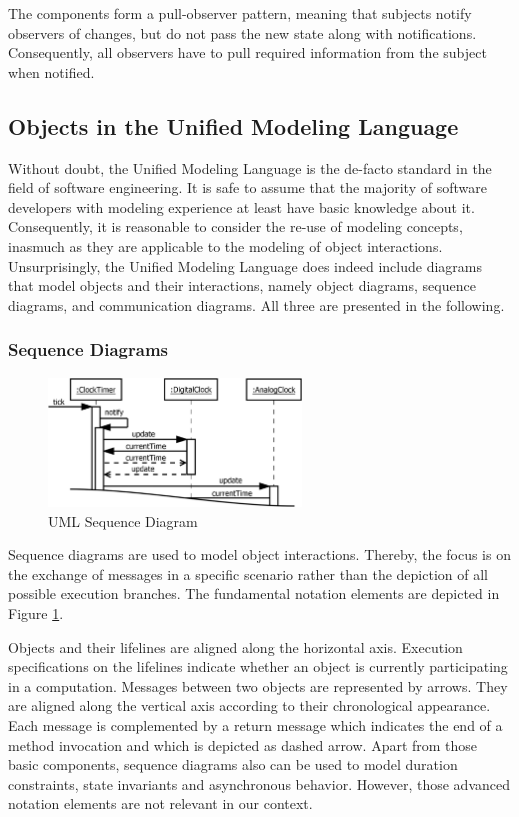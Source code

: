 The components form a pull-observer pattern, meaning that subjects notify observers of changes, but do not pass the new state along with notifications.
Consequently, all observers have to pull required information from the subject when notified.

\subsection{Objects in the Unified Modeling Language}
\label{ss:BackgroundModelingUML}
Without doubt, the Unified Modeling Language is the de-facto standard in the field of software engineering.
It is safe to assume that the majority of software developers with modeling experience at least have basic knowledge about it.
Consequently, it is reasonable to consider the re-use of modeling concepts, inasmuch as they are applicable to the modeling of object interactions.
Unsurprisingly, the Unified Modeling Language does indeed include diagrams that model objects and their interactions, namely object diagrams, sequence diagrams, and communication diagrams.
All three are presented in the following.

\subsubsection{Sequence Diagrams}

\begin{figure}
	\centering
	\includegraphics[width=0.6\textwidth]{../images/02-Sequence}
	\caption{UML Sequence Diagram}
	\label{fig:BackgroundModelingSequence}
\end{figure}

Sequence diagrams \cite{rumbaugh_unified_2010} are used to model object interactions.
Thereby, the focus is on the exchange of messages in a specific scenario rather than the depiction of all possible execution branches.
The fundamental notation elements are depicted in Figure \ref{fig:BackgroundModelingSequence}.

Objects and their lifelines are aligned along the horizontal axis.
Execution specifications on the lifelines indicate whether an object is currently participating in a computation.
Messages between two objects are represented by arrows.
They are aligned along the vertical axis according to their chronological appearance.
Each message is complemented by a return message which indicates the end of a method invocation and which is depicted as dashed arrow.
Apart from those basic components, sequence diagrams also can be used to model duration constraints, state invariants and asynchronous behavior.
However, those advanced notation elements are not relevant in our context.

